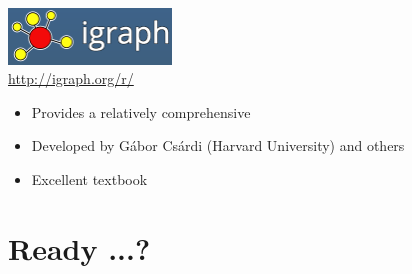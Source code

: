 \documentclass[8pt]{beamer}
\begin{document}
\begin{frame}
\frametitle{\insertsection}

\begin{center}
    \includegraphics[height=1.5cm]{../_shared_pics/igraph_logo}\\
    \url{http://igraph.org/r/}
\end{center}

\begin{itemize}[<+->]
\item Provides a relatively comprehensive {\color{blue}{set of tools to perform network analysis}}
\item Developed by G\'{a}bor Cs\'{a}rdi (Harvard University) and others
\item Excellent textbook \cite{Kolaczyk2014}
\end{itemize}

\end{frame}






\section{Ready ...?}


\bgroup
{}
\begin{frame}[plain]{}
\begin{center}
\color{white}{\Huge\insertsection}
\end{center}
\end{frame}
\egroup

\end{document}
